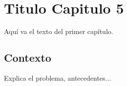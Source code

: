 \documentclass[../../DocumentoCompleto.tex]{subfiles}
\begin{document}
\chapter{Titulo Capitulo 5}

Aquí va el texto del primer capítulo.

\section{Contexto}
Explica el problema, antecedentes...
\end{document}
